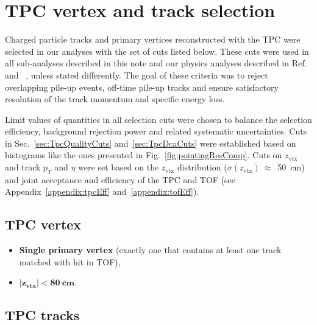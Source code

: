 

\chapter{TPC vertex and track selection}\label{chap:TpcTrackQualityCuts}

Charged particle tracks and primary vertices reconstructed with the TPC were selected in our analyses with the set of cuts listed below. These cuts were used in all sub-analyses described in this note and our physics analyses described in Ref.~\cite{AnalysisNoteRafal} and ~\cite{AnalysisNoteLukasz}, unless stated differently. The goal of these criteria was to reject overlapping pile-up events, off-time pile-up tracks and ensure satisfactory resolution of the track momentum and specific energy loss.

Limit values of quantities in all selection cuts were chosen to balance the selection efficiency, background rejection power and related systematic uncertainties. Cuts in Sec.~\ref{sec:TpcQualityCuts} and~\ref{sec:TpcDcaCuts} were established based on histograms like the ones presented in Fig.~\ref{fig:pointingResComp}. Cuts on $z_{\text{vtx}}$ and track $p_{T}$ and $\eta$ were set based on the $z_{\text{vtx}}$ distribution ($\sigma(z_{\text{vtx}})~\approx$~50~cm) and joint acceptance and efficiency of the TPC and TOF (see Appendix~\ref{appendix:tpcEff} and~\ref{appendix:tofEff}).

\section{TPC vertex}
\begin{itemize}
\item \textbf{Single primary vertex} (exactly one that contains at least one track matched with hit in TOF),
\item \textbf{$\bm{|z_{\text{vtx}}|<80~\text{cm}}$}.
\end{itemize}

\section{TPC tracks}
